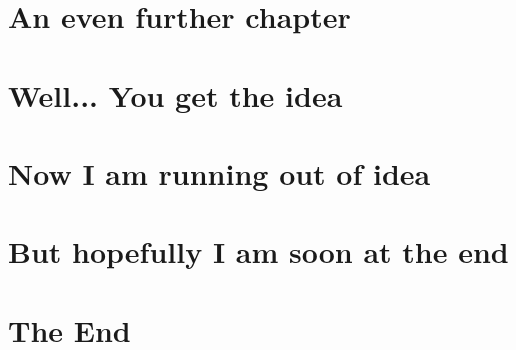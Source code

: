 \documentclass{RVTM}
\begin{document}
\setcounter{page}{46}
\chapter{An even further chapter}

\setcounter{page}{54}
\chapter{Well... You get the idea}
%
\setcounter{page}{62}
\chapter{Now I am running out of idea}

\setcounter{page}{89}
\chapter{But hopefully I am soon at the end}

\setcounter{page}{102}
\chapter{The End}
\end{document}
